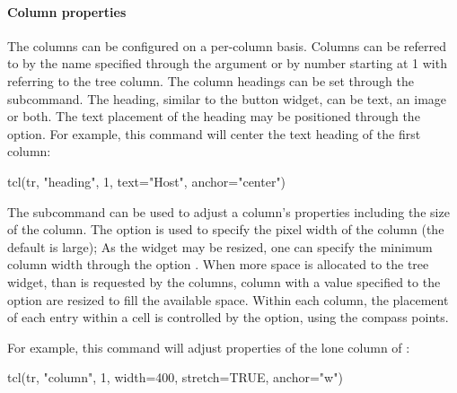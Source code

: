 \paragraph{Column properties}
The columns can be configured on a per-column basis. Columns can be
referred to by the name specified through the  argument
or by number starting at 1 with  referring to the tree
column. The column headings can be set through the
 subcommand. The heading, similar to
the button widget, can be text, an image or both. The text placement
of the heading may be positioned through the  option. For
example, this command will center the text heading of the first
column:
\begin{Schunk}
\begin{Sinput}
 tcl(tr, "heading", 1, text="Host", anchor="center")
\end{Sinput}
\end{Schunk}

The  subcommand can be used to adjust
a column's properties including the size of the column. The option
 is used to specify the pixel width of the column (the
default is large); As the widget may be resized, one can specify the
minimum column width through the option . When more
space is allocated to the tree widget, than is requested by the
columns, column with a  value specified to the option
 are resized to fill the available space. Within each
column, the placement of each entry within a cell is controlled by the
 option, using the compass points.

For example, this command will adjust properties of the lone column of :
\begin{Schunk}
\begin{Sinput}
 tcl(tr, "column", 1, width=400,  stretch=TRUE, anchor="w")
\end{Sinput}
\end{Schunk}

